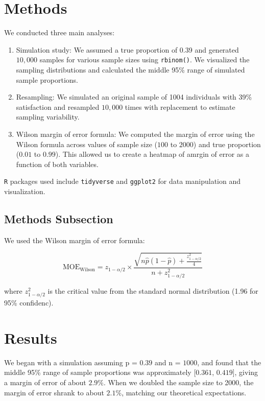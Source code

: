 \documentclass{article}\usepackage[]{graphicx}\usepackage[]{xcolor}
\begin{document}
\begin{multicols}{2}
\section{Methods}

We conducted three main analyses:
\begin{enumerate}
\item Simulation study: We assumed a true proportion of 0.39 and generated $10,000$ samples for various sample sizes using \texttt{rbinom()}. We visualized the sampling distributions and calculated the middle 95\% range of simulated sample proportions.
\item Resampling: We simulated an original sample of 1004 individuals with 39\% satisfaction and resampled $10,000$ times with replacement to estimate sampling variability.
\item Wilson margin of error formula: We computed the margin of error using the Wilson formula across values of sample size ($100$ to $2000$) and true proportion ($0.01$ to $0.99$). This allowed us to create a heatmap of amrgin of error as a function of both variables.
\end{enumerate}

\texttt{R} packages used include \texttt{tidyverse} and \texttt{ggplot2} for data manipulation and visualization.

\subsection{Methods Subsection}

We used the Wilson margin of error formula:

\[
\text{MOE}_{\text{Wilson}} = z_{1-\alpha/2} \times \frac{\sqrt{n\hat{p}(1-\hat{p}) + \frac{z_{1-\alpha/2}^2}{4}}}{n + z_{1-\alpha/2}^2}
\]

where $z_{1-\alpha/2}^2$ is the critical value from the standard normal distribution (1.96 for 95\% confidenc).


\section{Results}

We began with a simulation assuming p = $0.39$ and n = $1000$, and found that the middle 95\% range of sample proportions was approximately [$0.361$, $0.419$], giving a margin of error of about $2.9\%$. When we doubled the sample size to 2000, the margin of error shrank to about $2.1\%$, matching our theoretical expectations.


\end{multicols}
\end{document}
